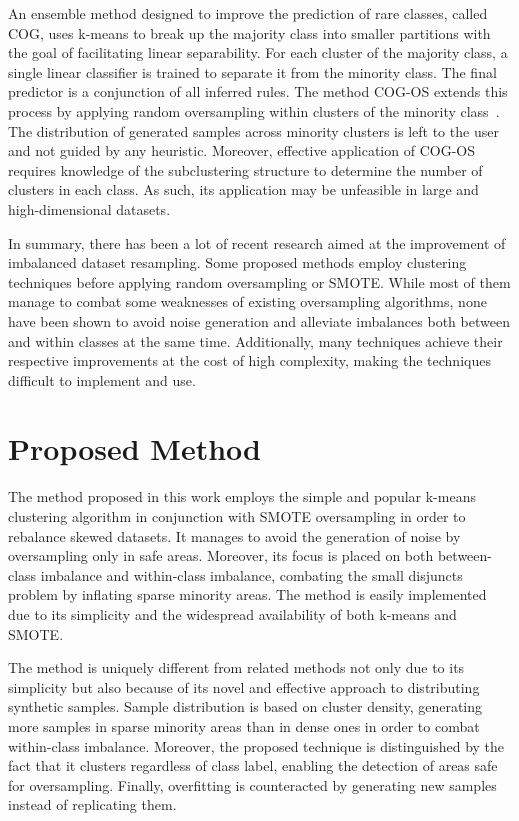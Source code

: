 \documentclass[sort&compress]{elsarticle}
\begin{document}
An ensemble method designed to improve the prediction of rare classes, called
COG, uses k-means to break up the majority class into smaller partitions with
the goal of facilitating linear separability. For each cluster of the majority
class, a single linear classifier is trained to separate it from the minority
class. The final predictor is a conjunction of all inferred rules. The method
COG-OS extends this process by applying random oversampling within clusters of
the minority class~\citep{Wu.2010}. The distribution of generated samples across
minority clusters is left to the user and not guided by any heuristic. Moreover,
effective application of COG-OS requires knowledge of the subclustering
structure to determine the number of clusters in each class. As such, its
application may be unfeasible in large and high-dimensional datasets.

In summary, there has been a lot of recent research aimed at the improvement of
imbalanced dataset resampling. Some proposed methods employ clustering
techniques before applying random oversampling or \ac{SMOTE}. While most of them
manage to combat some weaknesses of existing oversampling algorithms, none have
been shown to avoid noise generation and alleviate imbalances both between and
within classes at the same time. Additionally, many techniques achieve their
respective improvements at the cost of high complexity, making the techniques
difficult to implement and use.

\section{Proposed Method}
\label{sec:proposed-method}
The method proposed in this work employs the simple and popular k-means
clustering algorithm in conjunction with \ac{SMOTE} oversampling in order to
rebalance skewed datasets. It manages to avoid the generation of noise by
oversampling only in safe areas. Moreover, its focus is placed on both
between-class imbalance and within-class imbalance, combating the small
disjuncts problem by inflating sparse minority areas. The method is easily
implemented due to its simplicity and the widespread availability of both
k-means and \ac{SMOTE}.

The method is uniquely different from related methods not only due to its
simplicity but also because of its novel and effective approach to distributing
synthetic samples. Sample distribution is based on cluster density, generating
more samples in sparse minority areas than in dense ones in order to combat
within-class imbalance. Moreover, the proposed technique is distinguished by the
fact that it clusters regardless of class label, enabling the detection of areas
safe for oversampling. Finally, overfitting is counteracted by generating new
samples instead of replicating them.
\end{document}
